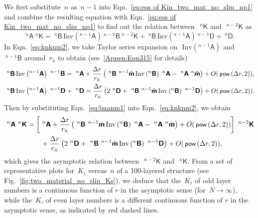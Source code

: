 \documentclass[preprint,12pt,times]{elsarticle}
\newcommand{\minus}[1]{\check{#1}}
\numberwithin{equation}{section}
\renewcommand{\u}[1]{\boldsymbol{#1}}
\newcommand{\usf}[1]{\u{\mathsf #1}}
\newcommand{\pr}[1]{\left( #1 \right)}
\newcommand{\p}{\,\textsf{\small pow}}
\newcommand{\Inv}{\,\mathrm{Inv}}
\renewcommand{\>}{$\Rightarrow$}
\begin{document}
We first substitute~$n$ as~$n-1$ into Eqn.~\eqref{eq:eqs of Kin_two_mat_no_slip_np1} and combine the resulting equation with Eqn.~\eqref{eq:eqs of Kin_two_mat_no_slip_np1} to find out the relation between~$~^{n}{\usf{K}}$ and~$~^{{n-2}}{\usf{K}}$ as
\begin{equation}
	~^{n}{\usf{A}} ~^{n}{\usf{K}}  = ~^{n}{\usf{B}} \Inv\pr{{}^{{n-1}}\usf{A}} ~^{{n-1}}{\usf{B}} ~^{{n-2}}{\usf{K}} + ~^{n}{\usf{B}} \Inv\pr{{}^{{n-1}}\usf{A}} ~^{{n-1}}{\usf{D}}  + ~^{n}{\usf{D}} .
	\label{eq:knknm2}
\end{equation}
In Eqn.~\eqref{eq:knknm2}, we take Taylor series expansion on~$\Inv\pr{{}^{{n-1}}\usf{A}}$ and~$~^{{n-1}}{\usf{B}}$ around~$r_{\minus{n}}$ to obtain (see~\ref{Appen:Eqn315} for details)
\begin{subequations}
	\begin{align}
	& ~^{n}{\usf{B}} \Inv\pr{{}^{{n-1}}\usf{A}} ~^{{n-1}}{\usf{B}} = ~^{n}{\usf{A}} + \frac{\Delta r}{r_{\minus{n}}} \left( ~^{n}{\usf{B}} ~^{n-1}\tilde{\usf{m}} \Inv\pr{{}^{n}\usf{B}} ~^{n}{\usf{A}} - ~^{n}{\usf{A}} ~^{n}\tilde{\usf{m}} \right)  + O(\p\pr{\Delta r,2}), \\
	& ~^{n}{\usf{B}} \Inv\pr{{}^{{n-1}}\usf{A}} ~^{{n-1}}{\usf{D}} + ~^{n}{\usf{D}} = \frac{\Delta r}{r_{\minus{n}}} \left( 2~^{n}{\usf{D}} + ~^{n}{\usf{B}} ~^{n-1}\tilde{\usf{m}} \Inv\pr{{}^{n}\usf{B}} ~^{{n-1}}{\usf{D}} \right) + O(\p\pr{\Delta r,2}).
	\end{align}
	\label{eq:bnanm1}
\end{subequations}
Then by substituting Eqn.~\eqref{eq:bnanm1} into Eqn.~\eqref{eq:knknm2}, we obtain
\begin{equation}
\begin{aligned}
	~^{n}{\usf{A}} ~^{n}{\usf{K}} & = \left[  ~^{n}{\usf{A}} + \frac{\Delta r}{r_{\minus{n}}} \left( ~^{n}{\usf{B}} ~^{n-1}\tilde{\usf{m}} \Inv\pr{{}^{n}\usf{B}} ~^{n}{\usf{A}} - ~^{n}{\usf{A}} ~^{n}\tilde{\usf{m}} \right)  + O(\p\pr{\Delta r,2}) \right] ~^{{n-2}}{\usf{K}} \\
	& \qquad + \frac{\Delta r}{r_{\minus{n}}} \left( 2~^{n}{\usf{D}} + ~^{n}{\usf{B}} ~^{n-1}\tilde{\usf{m}} \Inv\pr{{}^{n}\usf{B}} ~^{{n-1}}{\usf{D}} \right) + O(\p\pr{\Delta r,2}),
\end{aligned}
\label{eq:knknm2appr1}
\end{equation}
which gives the asymptotic relation between~$~^{{n-2}}{\usf{K}}$ and~$~^{n}{\usf{K}}$.
From a set of representative plots for~$K_{i}$ versus~$n$ of a 100-layered structure (see Fig.~\ref{fig:two_material_no_slip_Ks}), we deduce that the~$K_{i}$ of odd layer numbers is a continuous function of $r$ in the asymptotic sense (for~$N \to \infty$), while the~$K_{i}$ of even layer numbers is a different continuous function of $r$ in the asymptotic sense, as indicated by red dashed lines. 
\end{document}
